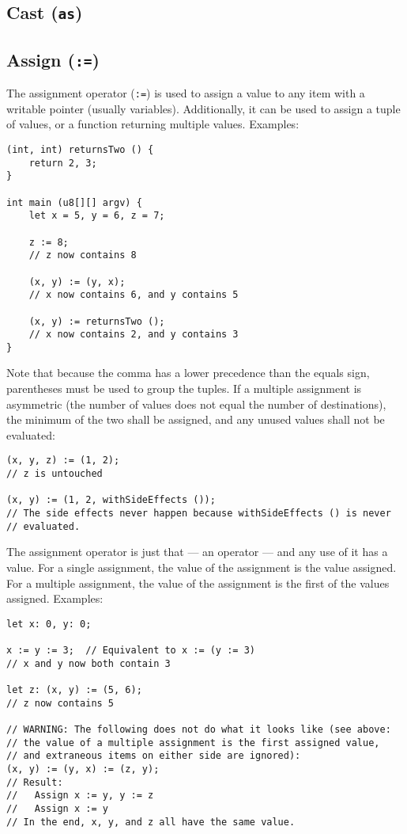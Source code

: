 \documentclass{article}
\begin{document}
\subsection{Cast (\texttt{as})}
\label{sub:operators:cast}

\subsection{Assign (\texttt{:=})}
\label{sub:operators:assign}
The assignment operator (\texttt{:=}) is used to assign a value to any item with
a writable pointer (usually variables). Additionally, it can be used to assign
a tuple of values, or a function returning multiple values.
Examples:
\begin{verbatim}
(int, int) returnsTwo () {
    return 2, 3;
}

int main (u8[][] argv) {
    let x = 5, y = 6, z = 7;

    z := 8;
    // z now contains 8

    (x, y) := (y, x);
    // x now contains 6, and y contains 5

    (x, y) := returnsTwo ();
    // x now contains 2, and y contains 3
}
\end{verbatim}

Note that because the comma has a lower precedence than the equals sign,
parentheses must be used to group the tuples. If a multiple assignment is
asymmetric (the number of values does not equal the number of destinations),
the minimum of the two shall be assigned, and any unused values shall not be
evaluated:
\begin{verbatim}
(x, y, z) := (1, 2);
// z is untouched

(x, y) := (1, 2, withSideEffects ());
// The side effects never happen because withSideEffects () is never
// evaluated.
\end{verbatim}

The assignment operator is just that --- an operator --- and any use of it has
a value. For a single assignment, the value of the assignment is the value
assigned. For a multiple assignment, the value of the assignment is the first
of the values assigned. Examples:
\begin{verbatim}
let x: 0, y: 0;

x := y := 3;  // Equivalent to x := (y := 3)
// x and y now both contain 3

let z: (x, y) := (5, 6);
// z now contains 5

// WARNING: The following does not do what it looks like (see above:
// the value of a multiple assignment is the first assigned value,
// and extraneous items on either side are ignored):
(x, y) := (y, x) := (z, y);
// Result:
//   Assign x := y, y := z
//   Assign x := y
// In the end, x, y, and z all have the same value.
\end{verbatim}
\end{document}
